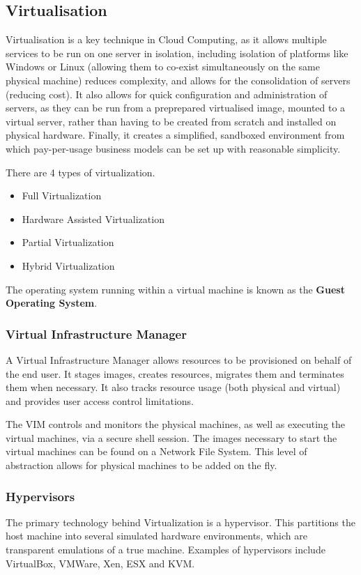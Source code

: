 \documentclass{article}
\begin{document}
{\begin{itemize}
\subsection{Virtualisation}
Virtualisation is a key technique in Cloud Computing, as it allows multiple services to be run on one server in isolation, including isolation of platforms like Windows or Linux (allowing them to co-exist simultaneously on the same physical machine) reduces complexity, and allows for the consolidation of servers (reducing cost). It also allows for quick configuration and administration of servers, as they can be run from a preprepared virtualised image, mounted to a virtual server, rather than having to be created from scratch and installed on physical hardware. Finally, it creates a simplified, sandboxed environment from which pay-per-usage business models can be set up with reasonable simplicity. 

There are 4 types of virtualization.

\begin{itemize}
    \item Full Virtualization
    \item Hardware Assisted Virtualization
    \item Partial Virtualization
    \item Hybrid Virtualization
\end{itemize}

The operating system running within a virtual machine is known as the \textbf{Guest Operating System}.

\subsubsection{Virtual Infrastructure Manager}
A Virtual Infrastructure Manager allows resources to be provisioned on behalf of the end user. It stages images, creates resources, migrates them and terminates them when necessary. It also tracks resource usage (both physical and virtual) and provides user access control limitations.

The VIM controls and monitors the physical machines, as well as executing the virtual machines, via a secure shell session. The images necessary to start the virtual machines can be found on a Network File System. This level of abstraction allows for physical machines to be added on the fly.

\subsubsection{Hypervisors}
The primary technology behind Virtualization is a hypervisor. This partitions the host machine into several simulated hardware environments, which are transparent emulations of a true machine. Examples of hypervisors include VirtualBox, VMWare, Xen, ESX and KVM.


\end{itemize}}
\end{document}
